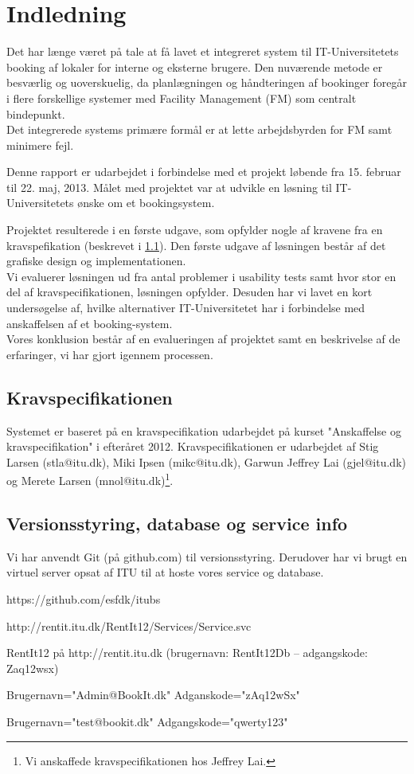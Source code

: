 \chapter{Indledning}
\label{Intro}
Det har længe været på tale at få lavet et integreret system til IT-Universitetets booking af lokaler for interne og eksterne brugere. Den nuværende metode er besværlig og uoverskuelig, da planlægningen og håndteringen af bookinger foregår i flere forskellige systemer med Facility Management (FM) som centralt bindepunkt\cite[Kap. A]{kravspec}.
\\Det integrerede systems primære formål er at lette arbejdsbyrden for FM samt minimere fejl. 

Denne rapport er udarbejdet i forbindelse med et projekt løbende fra 15. februar til 22. maj, 2013. Målet med projektet var at udvikle en løsning til IT-Universitetets ønske om et bookingsystem. 

Projektet resulterede i en første udgave, som opfylder nogle af kravene fra en kravspefikation (beskrevet i \ref{Intro_kravspec}). Den første udgave af løsningen består af det grafiske design og implementationen. 
\\Vi evaluerer løsningen ud fra antal problemer i usability tests samt hvor stor en del af kravspecifikationen, løsningen opfylder. Desuden har vi lavet en kort undersøgelse af, hvilke alternativer IT-Universitetet har i forbindelse med anskaffelsen af et booking-system.
\\Vores konklusion består af en evalueringen af projektet samt en beskrivelse af de erfaringer, vi har gjort igennem processen.

\section{Kravspecifikationen}
\label{Intro_kravspec}
Systemet er baseret på en kravspecifikation udarbejdet på kurset "Anskaffelse og kravspecifikation" i efteråret 2012. Kravspecifikationen er udarbejdet af Stig Larsen (stla@itu.dk), Miki Ipsen (mikc@itu.dk), Garwun Jeffrey Lai (gjel@itu.dk) og Merete Larsen (mnol@itu.dk)\footnote{Vi anskaffede kravspecifikationen hos Jeffrey Lai.}. 

\section{Versionsstyring, database og service info}
\label{Intro_vs}
Vi har anvendt Git (på github.com) til versionsstyring. Derudover har vi brugt en virtuel server opsat af ITU til at hoste vores service og database.
\begin{my_description}
\item[GitHub repository] https://github.com/esfdk/itubs
\item[Service URL] http://rentit.itu.dk/RentIt12/Services/Service.svc
\item[Database] RentIt12 på http://rentit.itu.dk (brugernavn: RentIt12Db -- adgangskode: Zaq12wsx)
\item[Test Administrator] Brugernavn="Admin@BookIt.dk" Adganskode="zAq12wSx"
\item[Test Bruger] Brugernavn="test@bookit.dk" Adgangskode="qwerty123"
\end{my_description}